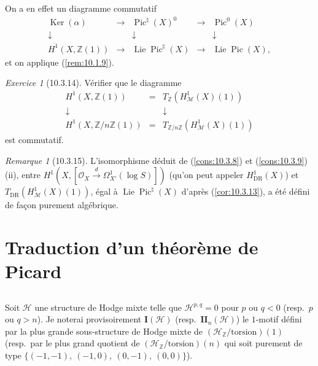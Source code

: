 \documentclass[12pt,a4paper]{amsart}
\theoremstyle{plain}
\theoremstyle{definition}
\theoremstyle{remark}
\newtheorem{remarque}[lemme]{Remarque}
\newtheorem{exercice}[lemme]{Exercice}
\DeclareMathOperator{\Ker}{Ker}
\DeclareMathOperator{\Pic}{Pic}
\DeclareMathOperator{\Lie}{Lie}
\numberwithin{equation}{section}
\begin{document}
On a en effet un diagramme commutatif
\[
\begin{array}{ccccc}
\Ker(\alpha) & \longrightarrow & \Pic^\natural(X)^0 & \longrightarrow & \Pic^0(X) \\
\downarrow & & \downarrow & & \downarrow \\
H^1(X,\mathbb{Z}(1)) & \longrightarrow & \Lie\Pic^\natural(X) & \longrightarrow & \Lie\Pic(X),
\end{array}
\]
et on applique (\ref{rem:10.1.9}).

\begin{exercice}[10.3.14]\label{ex:10.3.14}
Vérifier que le diagramme
\[
\begin{array}{ccc}
H^1(X,\mathbb{Z}(1)) & = & T_\mathbb{Z}(H_\mathscr{M}^1(X)(1)) \\
\downarrow & & \downarrow \\
H^1(X,\mathbb{Z}/n\mathbb{Z}(1)) & = & T_{\mathbb{Z}/n\mathbb{Z}}(H_\mathscr{M}^1(X)(1))
\end{array}
\]
est commutatif.
\end{exercice}

\begin{remarque}[10.3.15]\label{rem:10.3.15}
L'isomorphisme déduit de (\ref{cons:10.3.8}) et (\ref{cons:10.3.9}) (ii), entre $H^1(X,[\mathcal{O}_X\xrightarrow{d}\Omega_{X'}^1(\log S)])$ (qu'on peut appeler $H_\mathrm{DR}^1(X)$) et $T_\mathrm{DR}(H_\mathscr{M}^1(X)(1))$, égal à $\Lie\Pic^\natural(X)$ d'après (\ref{cor:10.3.13}), a été défini de façon purement algébrique.
\end{remarque}

\section{Traduction d'un théorème de Picard}\label{sec:10.4}

\subsection{}\label{10.4.1}
Soit $\mathscr{H}$ une structure de Hodge mixte telle que $\mathscr{H}^{p,q}=0$ pour $p$ ou $q<0$ (resp.~$p$ ou $q>n$). Je noterai provisoirement $\mathbf{I}(\mathscr{H})$ (resp.~$\mathbf{II}_n(\mathscr{H})$) le $1$-motif défini par la plus grande sous-structure de Hodge mixte de $(\mathscr{H}_\mathbb{Z}/\text{torsion})(1)$ (resp.~par le plus grand quotient de $(\mathscr{H}_\mathbb{Z}/\text{torsion})(n)$ qui soit purement de type $\{(-1,-1),\ (-1,0),\ (0,-1),\ (0,0)\}$).
\end{document}
